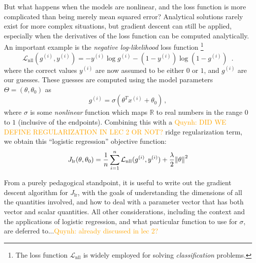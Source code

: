 \documentclass[11pt]{article}
\newcommand{\note}[1]{\todo[color=blue!10,
  linecolor=blue!90,size=\small]{\linespread{0.9}\selectfont{#1}\par}}
\renewcommand{\note}[1]{\footnote{#1}}
\newcommand\ex[2]{#1^{(#2)}}
\newcommand{\R}{\mathbb{R}}
\newcommand{\qn}[1]{\textcolor{orange}{Quynh: #1}}
\begin{document}
But what happens when the models are nonlinear, and the loss function
is more complicated than being merely mean squared error?  Analytical
solutions rarely exist for more complex situations, but gradient
descent can still be applied, especially when the derivatives of the
loss function can be computed analytically.  An important
example is the {\em negative log-likelihood} loss function \note{The loss function $\mathcal{L}_\text{nll}$ is widely employed for solving {\em classification} problems.}
\begin{equation}
  \mathcal{L}_\text{nll}(\ex{g}{i}, \ex{y}{i})  = - {\ex{y}{i}}\log {\ex{g}{i}} - (1 - \ex{y}{i})\log(1 - \ex{g}{i})
\;\;. 
\end{equation}
where the correct values $\ex{y}{i}$ are now assumed to be either $0$
or $1$, and $\ex{g}{i}$ are our guesses.  These guesses are computed
using the model parameters $\Theta = (\theta, \theta_0)$ as
\begin{equation}
  \ex{g}{i} = \sigma(\theta^T \ex{x}{i} + \theta_0)
\,,
\end{equation}
where $\sigma$ is some {\em nonlinear} function which maps $\R$ to
real numbers in the range $0$ to $1$ (inclusive of the endpoints).
Combining this with a \qn{DID WE DEFINE REGULARIZATION IN LEC 2 OR NOT?}  ridge regularization term, we obtain this
``logistic regression'' objective function:
\begin{equation}
  J_\text{lr}(\theta,\theta_0) = \frac{1}{n}\sum_{i=1}^n
                                 \mathcal{L}_\text{nll}
                                 (\ex{g}{i}, \ex{y}{i}) + \frac{\lambda}{2}\norm{\theta}^2
\end{equation}

From a purely pedagogical standpoint, it is useful to write out the
gradient descent algorithm for $J_\text{lr}$, with the goals of
understanding the dimensions of all the quantities involved, and how
to deal with a parameter vector that has both vector and scalar
quantities.  All other considerations, including the context and the
applications of logistic regression, and what particular function to
use for $\sigma$, are deferred to...\qn{already discussed in lec 2?}
\end{document}

